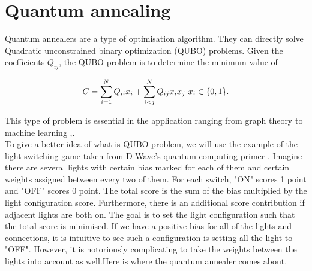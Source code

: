 \section{Quantum annealing}
\label{sec:annealing}

Quantum annealers are a type of optimisation algorithm. They  can directly solve Quadratic unconstrained binary optimization (QUBO) problems. Given the coefficients $Q_{ij}$, the QUBO problem is to determine the minimum value of

\begin{equation}
C=\sum_{i=1}^{N} Q_{ii}x_i+\sum_{i<j}^{N} Q_{ij}x_ix_j\\\\\ x_i\in\{0,1\}.
\end{equation}

This type of problem is essential in the application ranging from graph theory \cite{lucas_2014} to machine learning \cite{ogorman_2015},\cite{adachi_henderson}.\\

To give a better idea of what is QUBO problem, we will use the example of the light switching game taken from \href{https://www.dwavesys.com/tutorials/background-reading-series/quantum-computing-primer}{D-Wave's quantum computing primer} \cite{dwave}. Imagine there are several lights with certain bias marked for each of them and certain weights assigned between every two of them. For each switch, "ON" scores 1 point and "OFF" scores 0 point. The total score is the sum of the bias multiplied by the light configuration score. Furthermore, there is an additional score contribution if adjacent lights are both on. The goal is to set the light configuration such that the total score is minimised. If we have a positive bias for all of the lights and connections, it is intuitive to see such a configuration is setting all the light to "OFF". However, it is notoriously complicating to take the weights between the lights into account as well.Here is where the quantum annealer comes about.\\



